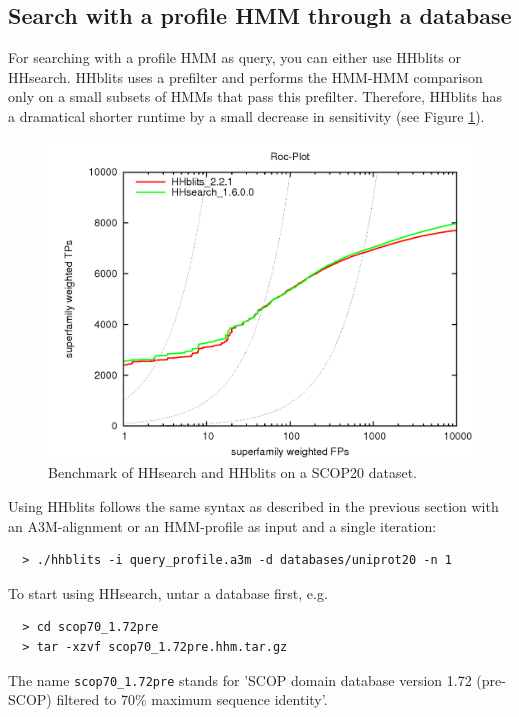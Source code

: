 \documentclass[11pt,a4paper]{article}
\begin{document}
\subsection{Search with a profile HMM through a database}

For searching with a profile HMM as query, you can either use HHblits or HHsearch. HHblits
uses a prefilter and performs the HMM-HMM comparison only on a small subsets of HMMs that pass
this prefilter. Therefore, HHblits has a dramatical shorter runtime by a small decrease in 
sensitivity (see Figure \ref{fig:hhsearch_hhblits_bench}). 

\begin{figure}[t]
\includegraphics[width=\textwidth]{hhblits-hhsearch.png}
\caption{Benchmark of HHsearch and HHblits on a SCOP20 dataset.}
\label{fig:hhsearch_hhblits_bench}
\end{figure}

Using HHblits follows the same syntax as described in the previous section with an A3M-alignment
or an HMM-profile as input and a single iteration:

\begin{verbatim}
  > ./hhblits -i query_profile.a3m -d databases/uniprot20 -n 1
\end{verbatim}


To start using HHsearch, untar a database first, e.g.
\begin{verbatim}
  > cd scop70_1.72pre
  > tar -xzvf scop70_1.72pre.hhm.tar.gz
\end{verbatim}

The name \verb`scop70_1.72pre` stands for 'SCOP domain database version 1.72 (pre-SCOP) 
filtered to 70\% maximum sequence identity'.
\end{document}
